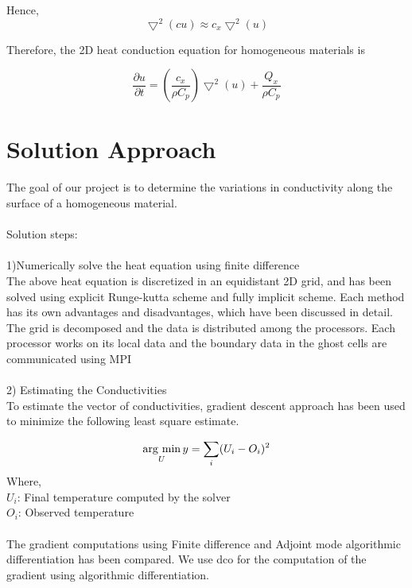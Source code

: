 \documentclass[10pt,a4paper]{report}
\newcommand{\argmin}{\mathop{\rm arg~min}\limits}
\begin{document}
Hence,
\begin{equation}
\bigtriangledown^2(cu) \approx c_x \bigtriangledown^2(u)
\end{equation}

Therefore, the 2D heat conduction equation for homogeneous materials is 

\begin{equation}
\frac{\partial u}{\partial t}=(\frac{c_x}{\rho C_p})\bigtriangledown^2(u)+\frac{Q_x}{\rho C_p}
\end{equation}

\section{Solution Approach}
The goal of our project is to determine the variations in conductivity along the surface of a homogeneous material.\\
\\
Solution steps:\\
\\
1)Numerically solve the heat equation using finite difference\\
The above heat equation is discretized in an equidistant 2D grid, and has been solved using explicit Runge-kutta scheme and fully implicit scheme. Each method has its own advantages and disadvantages, which have been discussed in detail. The grid is decomposed and the data is distributed among the processors. Each processor works on its local data and the boundary data in the ghost cells are communicated using MPI \\
\\
2) Estimating the Conductivities\\
To estimate the vector of conductivities, gradient descent approach has been used to minimize the following least square estimate.

\begin{equation}
\argmin_{\substack{U}} y= \sum_{\substack{i}}(U_i-O_i)^2
\end{equation}
Where,\\
$U_i$: Final temperature computed by the solver\\
$O_i$: Observed temperature\\
\\
The gradient computations using Finite difference and Adjoint mode algorithmic differentiation has been compared. We use dco for the computation of the gradient using algorithmic differentiation.
\pagebreak
\end{document}
